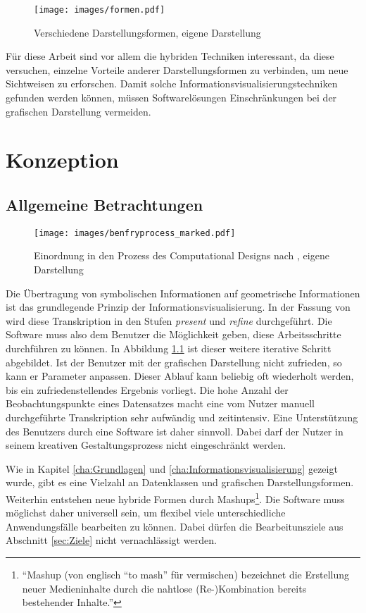 \documentclass[a4paper, 
               12pt,
               DIV=calc,
               version=first,
               pdftex,
               headsepline,
               footsepline,
               bibtotocnumbered,
               liststotocnumbered]{scrreprt}
\begin{document}
\begin{figure}
\centering
\texttt{[image: images/formen.pdf]}
\caption{Verschiedene Darstellungsformen, eigene Darstellung}
\label{fig:formen}
\end{figure}

Für diese Arbeit sind vor allem die hybriden Techniken interessant, da diese versuchen,
einzelne Vorteile anderer Darstellungsformen zu verbinden, um neue Sichtweisen zu erforschen.
Damit solche Informationsvisualisierungstechniken gefunden werden können, müssen
Softwarelösungen Einschränkungen bei der grafischen Darstellung vermeiden.

\chapter{Konzeption}
\label{cha:Software}
\section{Allgemeine Betrachtungen}
\label{sec:AllgemeineBetrachtungen}
\begin{figure}
\centering
\texttt{[image: images/benfryprocess\_marked.pdf]}
\caption{Einordnung in den Prozess des Computational Designs nach \citep{BenFry}, eigene Darstellung}
\label{fig:benfryprocess_marked}
\end{figure}
Die Übertragung von symbolischen Informationen auf geometrische Informationen ist das grundlegende Prinzip der
Informationsvisualisierung. In der Fassung von \cite{BenFry} wird diese Transkription in den
Stufen \textit{present} und \textit{refine} durchgeführt. Die Software muss also dem Benutzer die Möglichkeit geben,
diese Arbeitsschritte durchführen zu können. In Abbildung \ref{fig:benfryprocess_marked} ist dieser weitere iterative Schritt
abgebildet. Ist der Benutzer mit der grafischen Darstellung nicht zufrieden, so kann er Parameter anpassen. Dieser Ablauf
kann beliebig oft wiederholt werden, bis ein zufriedenstellendes Ergebnis vorliegt.
Die hohe Anzahl der Beobachtungspunkte eines Datensatzes macht eine vom Nutzer manuell durchgeführte Transkription
sehr aufwändig und zeitintensiv. Eine Unterstützung des Benutzers durch eine Software ist daher sinnvoll.
Dabei darf der Nutzer in seinem kreativen Gestaltungsprozess nicht eingeschränkt werden.

Wie in Kapitel \ref{cha:Grundlagen} und \ref{cha:Informationsvisualisierung} gezeigt wurde, gibt es eine Vielzahl an
Datenklassen und grafischen Darstellungsformen. Weiterhin entstehen neue hybride Formen durch Mashups\footnote{"`Mashup (von
englisch "`to mash"' für vermischen) bezeichnet die Erstellung neuer Medieninhalte durch die nahtlose
(Re-)Kombination bereits bestehender Inhalte."'\citep{wiki_mashup}}.
Die Software muss möglichst daher universell sein, um flexibel viele unterschiedliche Anwendungsfälle
bearbeiten zu können. Dabei dürfen die Bearbeitunsziele aus Abschnitt \ref{sec:Ziele} nicht
vernachlässigt werden.
\end{document}
